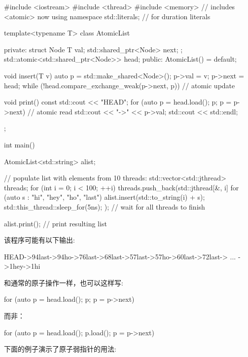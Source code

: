 \begin{cpp}
#include <iostream>
#include <thread>
#include <memory> // includes <atomic> now
using namespace std::literals; // for duration literals

template<typename T>
class AtomicList {
	private:
	struct Node {
		T val;
		std::shared_ptr<Node> next;
	};
	std::atomic<std::shared_ptr<Node>> head;
public:
	AtomicList() = default;
	
	void insert(T v) {
		auto p = std::make_shared<Node>();
		p->val = v;
		p->next = head;
		while (!head.compare_exchange_weak(p->next, p)) { // atomic update
		}
	}
	
	void print() const {
		std::cout << "HEAD";
		for (auto p = head.load(); p; p = p->next) { // atomic read
			std::cout << "->" << p->val;
		}
		std::cout << std::endl;
	}
};

int main()
{
	AtomicList<std::string> alist;
	
	// populate list with elements from 10 threads:
	{
		std::vector<std::jthread> threads;
		for (int i = 0; i < 100; ++i) {
			threads.push_back(std::jthread{[&, i]{
					for (auto s : {"hi", "hey", "ho", "last"}) {
						alist.insert(std::to_string(i) + s);
						std::this_thread::sleep_for(5ns);
					}
			}});
		}
	} // wait for all threads to finish
	
	alist.print(); // print resulting list
	}
\end{cpp}

该程序可能有以下输出:

\begin{shell}
HEAD->94last->94ho->76last->68last->57last->57ho->60last->72last-> ... ->1hey->1hi
\end{shell}

和通常的原子操作一样，也可以这样写:

\begin{cpp}
for (auto p = head.load(); p; p = p->next)
\end{cpp}

而非：

\begin{cpp}
for (auto p = head.load(); p.load(); p = p->next)
\end{cpp}


下面的例子演示了原子弱指针的用法:


